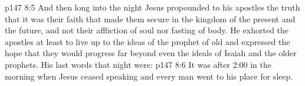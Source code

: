 \vs p147 8:5 \pc And then long into the night Jesus propounded to his apostles the truth that it was their faith that made them secure in the kingdom of the present and the future, and not their affliction of soul nor fasting of body. He exhorted the apostles at least to live up to the ideas of the prophet of old and expressed the hope that they would progress far beyond even the ideals of Isaiah and the older prophets. His last words that night were: 
\vs p147 8:6 It was after 2:00 in the morning when Jesus ceased speaking and every man went to his place for sleep.

